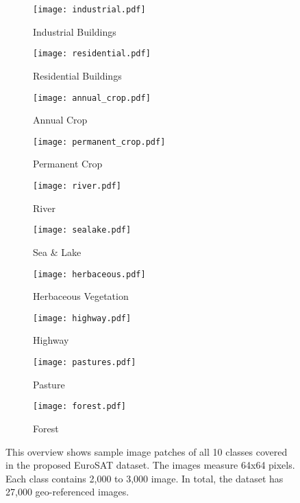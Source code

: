 \documentclass[journal]{IEEEtran}
\begin{document}
\begin{figure*}
\centering
  \begin{subfigure}[b]{.19\linewidth}
    \centering
    \texttt{[image: industrial.pdf]}
    \caption{Industrial Buildings}\label{fig:1a}
  \end{subfigure}%
  \begin{subfigure}[b]{.19\linewidth}
    \centering
    \texttt{[image: residential.pdf]}
    \caption{Residential Buildings}\label{fig:1b}
  \end{subfigure}%
  \begin{subfigure}[b]{.19\linewidth}
    \centering
    \texttt{[image: annual\_crop.pdf]}
    \caption{Annual Crop}\label{fig:1c}
  \end{subfigure}%
  \begin{subfigure}[b]{.19\linewidth}
    \centering
    \texttt{[image: permanent\_crop.pdf]}
    \caption{Permanent Crop}\label{fig:1d}
  \end{subfigure}%
  \begin{subfigure}[b]{.19\linewidth}
    \centering
    \texttt{[image: river.pdf]}
    \caption{River}\label{fig:1i}
  \end{subfigure}%
    \vspace{+0.25cm}
  \begin{subfigure}[b]{.19\linewidth}
    \centering
    \texttt{[image: sealake.pdf]}
    \caption{Sea \& Lake}\label{fig:1j}
  \end{subfigure}%
  \begin{subfigure}[b]{.19\linewidth}
    \centering
    \texttt{[image: herbaceous.pdf]}
    \caption{Herbaceous Vegetation}\label{fig:1k}
  \end{subfigure}%
  \begin{subfigure}[b]{.19\linewidth}
    \centering
    \texttt{[image: highway.pdf]}
    \caption{Highway}\label{fig:1l}
  \end{subfigure}%
  \begin{subfigure}[b]{.19\linewidth}
    \centering
    \texttt{[image: pastures.pdf]}
    \caption{Pasture}\label{fig:1m}
  \end{subfigure}%
  \begin{subfigure}[b]{.19\linewidth}
    \centering
    \texttt{[image: forest.pdf]}
    \caption{Forest}\label{fig:1m}
  \end{subfigure}%
  \caption{This overview shows sample image patches of all 10 classes covered in the proposed EuroSAT dataset. The images measure 64x64 pixels. Each class contains 2,000 to 3,000 image. In total, the dataset has 27,000 geo-referenced images.}\label{fig:sentinel_2dataset_labels}
\end{figure*}
\end{document}
